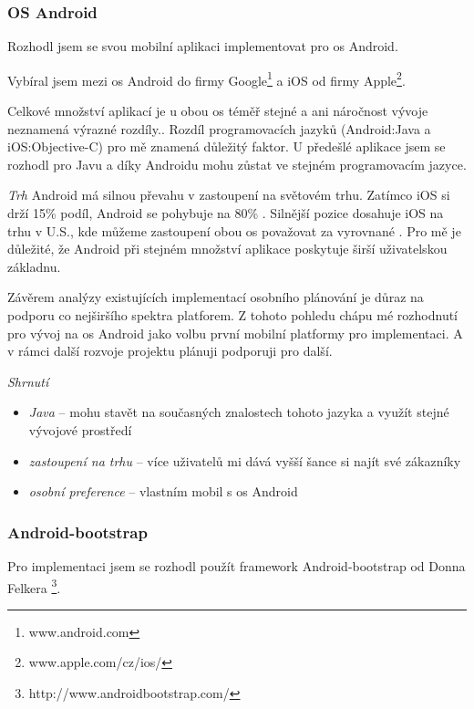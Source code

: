 \documentclass[thesis=B,czech]{FITthesis}[2012/06/26]
\begin{document}
\subsubsection {OS Android}

Rozhodl jsem se svou mobilní aplikaci implementovat pro \acrshort{os} Android.

Vybíral jsem mezi \acrshort{os} Android do firmy Google\footnote{www.android.com} a iOS od firmy Apple\footnote{www.apple.com/cz/ios/}.
 
Celkové množství aplikací je u obou \acrshort{os} téměř stejné a ani náročnost vývoje neznamená výrazné rozdíly.\cite{android_what_choose}. Rozdíl programovacích jazyků (Android:Java a iOS:Objective-C) pro mě znamená důležitý faktor. U předešlé aplikace jsem se rozhodl pro Javu a díky Androidu mohu zůstat ve stejném programovacím jazyce.

\textit{Trh}
Android má silnou převahu v zastoupení na světovém trhu. Zatímco iOS si drží 15\% podíl, Android se pohybuje na 80\% \cite{android_market}. Silnější pozice dosahuje iOS na trhu v U.S., kde můžeme zastoupení obou \acrshort{os} považovat za vyrovnané \cite{android_market_us}. 
Pro mě je důležité, že Android při stejném množství aplikace poskytuje širší uživatelskou základnu. 

Závěrem analýzy existujících implementací osobního plánování je důraz na podporu co nejširšího spektra platforem. Z tohoto pohledu chápu mé rozhodnutí pro vývoj na \acrshort{os} Android jako volbu první mobilní platformy pro implementaci. A v rámci další rozvoje projektu plánuji podporuji pro další.\newline

\textit{Shrnutí}
\begin{itemize}[nosep]
	\item \textit{Java} -- mohu stavět na současných znalostech tohoto jazyka a využít stejné vývojové prostředí
	\item \textit{zastoupení na trhu} -- více uživatelů mi dává vyšší šance si najít své zákazníky
	\item \textit{osobní preference} -- vlastním mobil s \acrshort{os} Android
\end{itemize}

\subsubsection{Android-bootstrap}
\label{technologie:androdi:boostrap}
Pro implementaci jsem se rozhodl použít framework Android-bootstrap od Donna Felkera \footnote{http://www.androidbootstrap.com/}.
\end{document}
